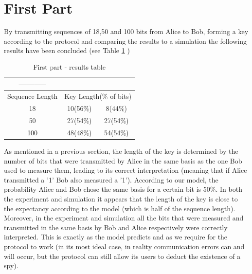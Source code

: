 \documentclass[reprint,amsmath,amssymb,aps, prl,superscriptaddress]{revtex4-2}
\begin{document}
\section*{First Part}
 By transmitting sequences of 18,50 and 100 bits from Alice to Bob, forming a key according to the protocol and comparing the results to a simulation the following results have been concluded (see Table
\ref{tab: Part I results table} ) 
\begin{table}[H]
	\centering
	\begin{tabular}{|c|c|c|}
		\hline 
		----------- & \thead{Experiment} & \thead{Simulation}\tabularnewline
		\hline 
		\hline 
		Sequence Length & \multicolumn{2}{c|}{Key Length($\%$ of bits)}\tabularnewline
		\hline 
		18 & 10(56\%) & 8(44\%)\tabularnewline
		\hline 
		50 & 27(54\%) & 27(54\%)\tabularnewline
		\hline 
		100 & 48(48\%) & 54(54\%)\tabularnewline
		\hline 
	\end{tabular}

\caption{First part - results table\label{tab: Part I results table}}

\end{table} 
As mentioned in a previous section, the length of the key is determined by the number of bits that were transmitted by Alice in the same basis as the one Bob used to measure them, leading to its correct interpretation (meaning that if Alice transmitted a '1' Bob also measured a '1'). According to our model, the probability Alice and Bob chose the same basis for a certain bit is $50\%$. In both the experiment and simulation it appears that the length of the key is close to the expectancy according to the model (which is half of the sequence length). Moreover, in the experiment and simulation all the bits that were measured and transmitted in the same basis by Bob and Alice respectively were correctly interpreted. This is exactly as the model predicts and as we require for the protocol to work (in its most ideal case, in reality communication errors can and will occur, but the protocol can still allow its users to deduct the existence of a spy). 
\end{document}

